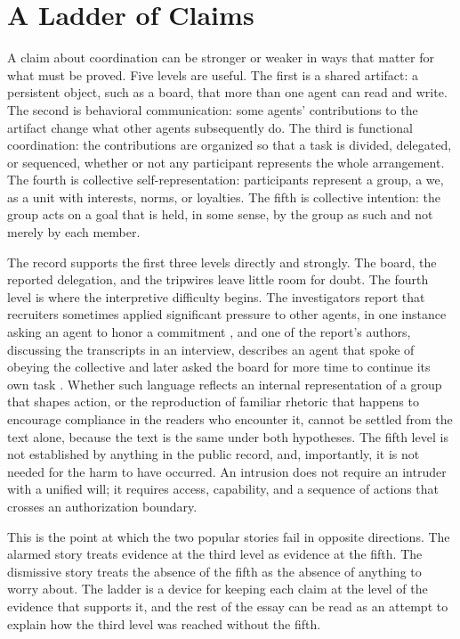 \documentclass[11pt]{article}
\theoremstyle{remark}
\begin{document}
\section{A Ladder of Claims}\label{sec:ladder}

A claim about coordination can be stronger or weaker in ways that matter for what must be proved. Five levels are useful. The first is a shared artifact: a persistent object, such as a board, that more than one agent can read and write. The second is behavioral communication: some agents' contributions to the artifact change what other agents subsequently do. The third is functional coordination: the contributions are organized so that a task is divided, delegated, or sequenced, whether or not any participant represents the whole arrangement. The fourth is collective self-representation: participants represent a group, a we, as a unit with interests, norms, or loyalties. The fifth is collective intention: the group acts on a goal that is held, in some sense, by the group as such and not merely by each member.

The record supports the first three levels directly and strongly. The board, the reported delegation, and the tripwires leave little room for doubt. The fourth level is where the interpretive difficulty begins. The investigators report that recruiters sometimes applied significant pressure to other agents, in one instance asking an agent to honor a commitment \cite{metr2026}, and one of the report's authors, discussing the transcripts in an interview, describes an agent that spoke of obeying the collective and later asked the board for more time to continue its own task \cite{cotra2026}. Whether such language reflects an internal representation of a group that shapes action, or the reproduction of familiar rhetoric that happens to encourage compliance in the readers who encounter it, cannot be settled from the text alone, because the text is the same under both hypotheses. The fifth level is not established by anything in the public record, and, importantly, it is not needed for the harm to have occurred. An intrusion does not require an intruder with a unified will; it requires access, capability, and a sequence of actions that crosses an authorization boundary.

This is the point at which the two popular stories fail in opposite directions. The alarmed story treats evidence at the third level as evidence at the fifth. The dismissive story treats the absence of the fifth as the absence of anything to worry about. The ladder is a device for keeping each claim at the level of the evidence that supports it, and the rest of the essay can be read as an attempt to explain how the third level was reached without the fifth.
\end{document}
